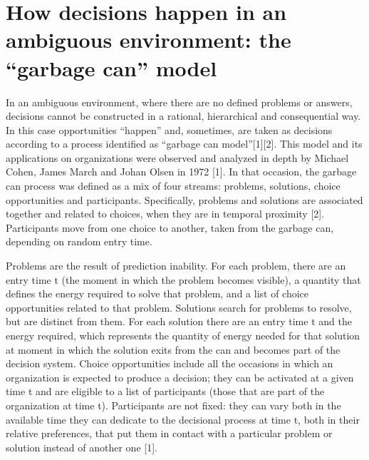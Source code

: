 \section{How decisions happen in an ambiguous environment: the “garbage can” model}

In an ambiguous environment, where there are no defined problems or answers, decisions cannot be constructed in a rational, hierarchical and consequential way. In this case opportunities “happen” and, sometimes, are taken as decisions according to a process identified as “garbage can model”[1][2]. This model and its applications on organizations were observed and analyzed in depth by Michael Cohen, James March and Johan Olsen in 1972 [1]. In that occasion, the garbage can process was defined as a mix of four streams: problems, solutions, choice opportunities and participants. Specifically, problems and solutions are associated together and related to choices, when they are in temporal proximity [2]. Participants move from one choice to another, taken from the garbage can, depending on random entry time.

Problems are the result of prediction inability. For each problem, there are an entry time t (the moment in which the problem becomes visible), a quantity that defines the energy required to solve that problem, and a list of choice opportunities related to that problem. Solutions search for problems to resolve, but are distinct from them. For each solution there are an entry time t and the energy required, which represents the quantity of energy needed for that solution at moment in which the solution exits from the can and becomes part of the decision system. Choice opportunities include all the occasions in which an organization is expected to produce a decision; they  can be activated at a given time t and are eligible to a list of participants (those that are part of the organization at time t). Participants are not fixed: they can vary both in the available time they can dedicate to the decisional process at time t, both in their relative preferences, that put them in contact with a particular problem or solution instead of another one [1].

